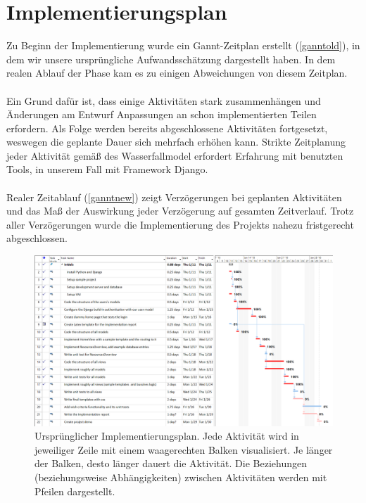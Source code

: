 \documentclass[parskip=full,11pt]{scrartcl}
\begin{document}
\section{Implementierungsplan}
Zu Beginn der Implementierung wurde ein Gannt-Zeitplan erstellt (\autoref{ganntold}), in dem wir unsere ursprüngliche  Aufwandsschätzung dargestellt haben. In dem realen Ablauf der Phase kam es zu einigen Abweichungen von diesem Zeitplan.\\\\
Ein Grund dafür ist, dass einige Aktivitäten stark zusammenhängen und Änderungen am Entwurf Anpassungen an schon implementierten Teilen erfordern. Als Folge werden bereits abgeschlossene Aktivitäten fortgesetzt, weswegen die geplante Dauer sich mehrfach erhöhen kann. Strikte Zeitplanung jeder Aktivität gemäß des Wasserfallmodel erfordert Erfahrung mit benutzten Tools, in unserem Fall mit Framework Django.\\\\ 
Realer Zeitablauf (\autoref{ganntnew}) zeigt Verzögerungen bei geplanten Aktivitäten und das Maß der Auswirkung jeder Verzögerung auf gesamten Zeitverlauf. Trotz aller Verzögerungen wurde die Implementierung des Projekts nahezu fristgerecht abgeschlossen.\\


 \begin{figure}[ht!]
 	\centering
 	\includegraphics[width=1\textwidth]{res/gannt_plan.png}
 	\caption{Ursprünglicher Implementierungsplan. Jede Aktivität wird in jeweiliger Zeile mit einem waagerechten Balken visualisiert. Je länger der Balken, desto länger dauert die Aktivität. Die Beziehungen (beziehungsweise Abhängigkeiten) zwischen Aktivitäten werden mit Pfeilen dargestellt.}
 	\label{ganntold}
 \end{figure}
 
\end{document}
